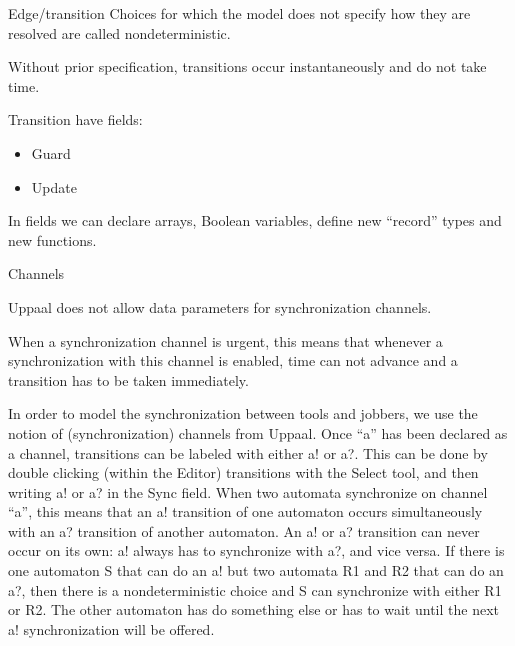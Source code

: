 \documentclass{beamer}
\begin{document}
\begin{frame}{Edge/transition}
	Choices for which the model does not specify how they are resolved are called
	nondeterministic.\newline
	
	Without prior specification, transitions occur instantaneously and do not take time.\newline
	
	Transition have fields:
	\begin{itemize}
		\item Guard
		\item Update
	\end{itemize}
	
	In fields we can declare arrays, Boolean variables, define new ``record'' types and new functions.
	
\end{frame}

\begin{frame}{Channels}
	
	Uppaal does not allow
	data parameters for synchronization channels.
	
	When a synchronization channel is urgent, this means that whenever a synchronization with this channel is enabled, time can not advance and a transition has to be taken immediately.\newline
	
	In order to model the synchronization between tools and jobbers,
	we use the notion of (synchronization) channels from Uppaal. Once “a” has been
	declared as a channel, transitions can be labeled with either a! or a?. This can be
	done by double clicking (within the Editor) transitions with the Select tool, and then
	writing a! or a? in the Sync field. When two automata synchronize on channel “a”,
	this means that an a! transition of one automaton occurs simultaneously with an
	a? transition of another automaton. An a! or a? transition can never occur on its
	own: a! always has to synchronize with a?, and vice versa. If there is one automaton
	S that can do an a! but two automata R1 and R2 that can do an a?, then there is
	a nondeterministic choice and S can synchronize with either R1 or R2. The other
	automaton has do something else or has to wait until the next a! synchronization
	will be offered.
\end{frame}
\end{document}
